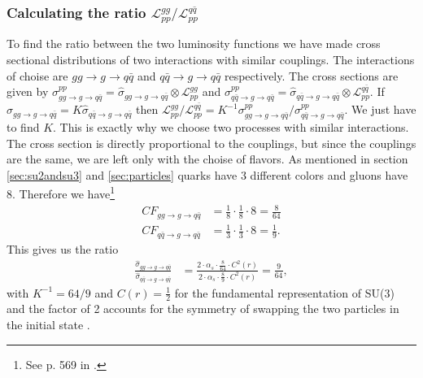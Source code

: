 \subsubsection{Calculating the ratio ${\mathcal{L}_{pp}^{gg}}/{\mathcal{L}_{pp}^{q \bar q}}$}
To find the ratio between the two luminosity functions we have made cross sectional distributions of two interactions with similar couplings. The interactions of choise are  $gg \rightarrow g \rightarrow q \bar q$ and $q \bar q \rightarrow g \rightarrow q \bar q$ respectively. The cross sections are given by  $\sigma^{pp}_{gg \rightarrow g \rightarrow q \bar q}=\hat \sigma_{gg \rightarrow g \rightarrow q \bar q} \otimes \mathcal{L}_{pp}^{gg}$ and $\sigma^{pp}_{q \bar q \rightarrow g \rightarrow q \bar q}= \hat \sigma_{q \bar q \rightarrow g \rightarrow q \bar q} \otimes \mathcal{L}_{pp}^{q \bar q}$. If $\hat \sigma_{gg \rightarrow g \rightarrow q \bar q} = K \hat \sigma_{q \bar q \rightarrow g \rightarrow q \bar q}$ then $\mathcal{L}_{pp}^{gg}/\mathcal{L}_{pp}^{q \bar q} = K^{-1} \sigma^{pp}_{gg \rightarrow g \rightarrow q \bar q}/\sigma^{pp}_{q \bar q \rightarrow g \rightarrow q \bar q}$. We just have to find $K$. This is exactly why we choose two processes with similar interactions. The cross section is directly proportional to the couplings, but since the couplings are the same, we are left only with the choise of flavors. As mentioned in section \ref{sec:su2andsu3} and \ref{sec:particles} quarks have 3 different colors and gluons have 8. Therefore we have\footnote{See p. 569 in  \cite{peskin1993iqf}.}
\begin{align}
	CF_{gg \rightarrow g \rightarrow q \bar q}&=\frac{1}{8} \cdot \frac{1}{8} \cdot 8=\frac{8}{64}\\
	CF_{q \bar q \rightarrow g \rightarrow q \bar q}&=\frac{1}{3} \cdot \frac{1}{3} \cdot 8=\frac{1}{9}.
\end{align}
This gives us the ratio
\begin{align}
	\frac{\hat \sigma_{gg \rightarrow g \rightarrow q \bar q}}{\hat \sigma_{q \bar q \rightarrow g \rightarrow q \bar q}} &=\frac{2 \cdot \alpha_{s} \cdot \frac{8}{64} \cdot C^{2}(r)}{2 \cdot \alpha_{s} \cdot \frac{8}{9} \cdot C^{2}(r)}=\frac{9}{64},
\end{align}
with $K^{-1}=64/9$ and $C(r) = \frac{1}{2}$ for the fundamental representation of SU(3) and the factor of 2 accounts for the symmetry of swapping the two particles in the initial state \cite{peskin1993iqf}.

